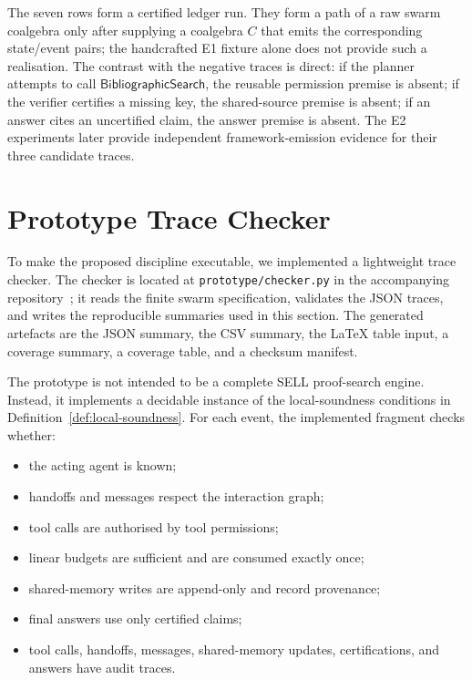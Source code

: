 \documentclass[a4paper,fleqn]{cas-sc}
\begin{document}
The seven rows form a certified ledger run. They form a path of a raw swarm
coalgebra only after supplying a coalgebra \(C\) that emits the corresponding
state/event pairs; the handcrafted E1 fixture alone does not provide such a
realisation. The contrast with the negative traces is direct: if the planner
attempts to call \(\mathsf{BibliographicSearch}\), the reusable permission
premise is absent; if the verifier certifies a missing key, the shared-source
premise is absent; if an answer cites an uncertified claim, the answer premise
is absent. The E2 experiments later provide independent framework-emission
evidence for their three candidate traces.

\section{Prototype Trace Checker}\label{sec:prototype}

To make the proposed discipline executable, we implemented a lightweight trace checker. The checker is located at \texttt{prototype/checker.py} in the accompanying repository~\cite{artifact2026}; it reads the finite swarm specification, validates the JSON traces, and writes the reproducible summaries used in this section. The generated artefacts are the JSON summary, the CSV summary, the LaTeX table input, a coverage summary, a coverage table, and a checksum manifest.

The prototype is not intended to be a complete SELL proof-search engine. Instead, it implements a decidable instance of the local-soundness conditions in Definition~\ref{def:local-soundness}. For each event, the implemented fragment checks whether:
\begin{itemize}
  \item the acting agent is known;
  \item handoffs and messages respect the interaction graph;
  \item tool calls are authorised by tool permissions;
  \item linear budgets are sufficient and are consumed exactly once;
  \item shared-memory writes are append-only and record provenance;
  \item final answers use only certified claims;
  \item tool calls, handoffs, messages, shared-memory updates, certifications, and answers have audit traces.
\end{itemize}
\end{document}
